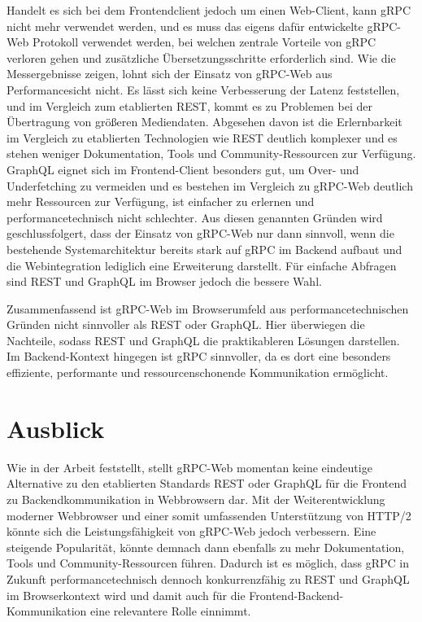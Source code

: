 Handelt es sich bei dem Frontendclient jedoch um einen Web-Client, kann gRPC nicht mehr verwendet werden, und es muss das eigens dafür entwickelte gRPC-Web Protokoll verwendet werden, bei welchen zentrale Vorteile von gRPC verloren gehen und zusätzliche Übersetzungsschritte erforderlich sind. Wie die Messergebnisse zeigen, lohnt sich der Einsatz von gRPC-Web aus Performancesicht nicht. Es lässt sich keine Verbesserung der Latenz feststellen, und im Vergleich zum etablierten REST, kommt es zu Problemen bei der Übertragung von größeren Mediendaten. Abgesehen davon ist die Erlernbarkeit im Vergleich zu etablierten Technologien wie REST deutlich komplexer und es stehen weniger Dokumentation, Tools und Community-Ressourcen zur Verfügung. GraphQL eignet sich im Frontend-Client besonders gut, um Over- und Underfetching zu vermeiden und es bestehen im Vergleich zu gRPC-Web deutlich mehr Ressourcen zur Verfügung, ist einfacher zu erlernen und performancetechnisch nicht schlechter. 
Aus diesen genannten Gründen wird geschlussfolgert, dass der Einsatz von gRPC-Web nur dann sinnvoll, wenn die bestehende Systemarchitektur bereits stark auf gRPC im Backend aufbaut und die Webintegration lediglich eine Erweiterung darstellt. Für einfache Abfragen sind REST und GraphQL im Browser jedoch die bessere Wahl.


Zusammenfassend ist gRPC-Web im Browserumfeld aus performancetechnischen Gründen nicht sinnvoller als REST oder GraphQL. Hier überwiegen die Nachteile, sodass REST und GraphQL die praktikableren Lösungen darstellen. Im Backend-Kontext hingegen ist gRPC sinnvoller, da es dort eine besonders effiziente, performante und ressourcenschonende Kommunikation ermöglicht.


\section{Ausblick}
Wie in der Arbeit feststellt, stellt gRPC-Web momentan keine eindeutige Alternative zu den etablierten Standards REST oder GraphQL für die Frontend zu Backendkommunikation in Webbrowsern dar. Mit der Weiterentwicklung moderner Webbrowser und einer somit umfassenden Unterstützung von HTTP/2 könnte sich die Leistungsfähigkeit von gRPC-Web jedoch verbessern. Eine steigende Popularität, könnte demnach dann ebenfalls zu mehr Dokumentation, Tools und Community-Ressourcen führen. Dadurch ist es möglich, dass gRPC in Zukunft performancetechnisch dennoch konkurrenzfähig zu REST und GraphQL im Browserkontext wird und damit auch für die Frontend-Backend-Kommunikation eine relevantere Rolle einnimmt.
\chapterend
